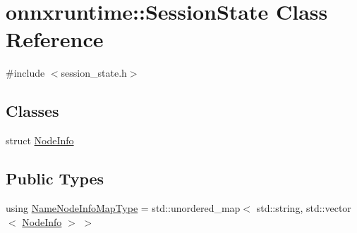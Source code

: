 \hypertarget{classonnxruntime_1_1SessionState}{}\section{onnxruntime\+:\+:Session\+State Class Reference}
\label{classonnxruntime_1_1SessionState}


{\ttfamily \#include $<$session\+\_\+state.\+h$>$}

\subsection*{Classes}
\begin{DoxyCompactItemize}
\item 
struct \mbox{\hyperlink{structonnxruntime_1_1SessionState_1_1NodeInfo}{Node\+Info}}
\end{DoxyCompactItemize}
\subsection*{Public Types}
\begin{DoxyCompactItemize}
\item 
using \mbox{\hyperlink{classonnxruntime_1_1SessionState_ae235b8dfb073b021d014a42b5dcc0072}{Name\+Node\+Info\+Map\+Type}} = std\+::unordered\+\_\+map$<$ std\+::string, std\+::vector$<$ \mbox{\hyperlink{structonnxruntime_1_1SessionState_1_1NodeInfo}{Node\+Info}} $>$ $>$
\end{DoxyCompactItemize}
